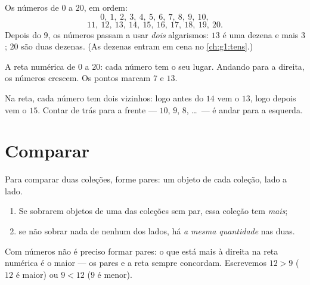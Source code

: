 \begin{example}\label{ex:g1:counting:writing}
Os números de $0$ a $20$, em ordem:
\[
0,\ 1,\ 2,\ 3,\ 4,\ 5,\ 6,\ 7,\ 8,\ 9,\ 10,
\]
\[
11,\ 12,\ 13,\ 14,\ 15,\ 16,\ 17,\ 18,\ 19,\ 20 .
\]
Depois do $9$, os números passam a usar \emph{dois} algarismos: $13$
é uma dezena e mais $3$; $20$ são duas dezenas. (As dezenas entram
em cena no \cref{ch:g1:tens}.)
\end{example}

\begin{omfigure}

{\small A reta numérica de $0$ a $20$: cada número tem o seu lugar.
Andando para a direita, os números crescem. Os pontos marcam $7$ e
$13$.}
\end{omfigure}

\begin{example}\label{ex:g1:counting:neighbors}
Na reta, cada número tem dois vizinhos: logo antes do $14$ vem o
$13$, logo depois vem o $15$. Contar de trás para a frente ---
$10$, $9$, $8$, \dots\ --- é andar para a esquerda.
\end{example}

\section{Comparar}

\begin{method}\label{met:g1:counting:compare}
Para comparar duas coleções, forme pares: um objeto de cada coleção,
lado a lado.
\begin{enumerate}
  \item Se sobrarem objetos de uma das coleções sem par, essa coleção
        tem \emph{mais};
  \item se não sobrar nada de nenhum dos lados, há \emph{a mesma
        quantidade} nas duas.
\end{enumerate}
Com números não é preciso formar pares: o que está mais à direita na
reta numérica é o maior --- os pares e a reta sempre concordam.
Escrevemos $12 > 9$ ($12$ é maior) ou $9 < 12$ ($9$ é menor).
\end{method}


